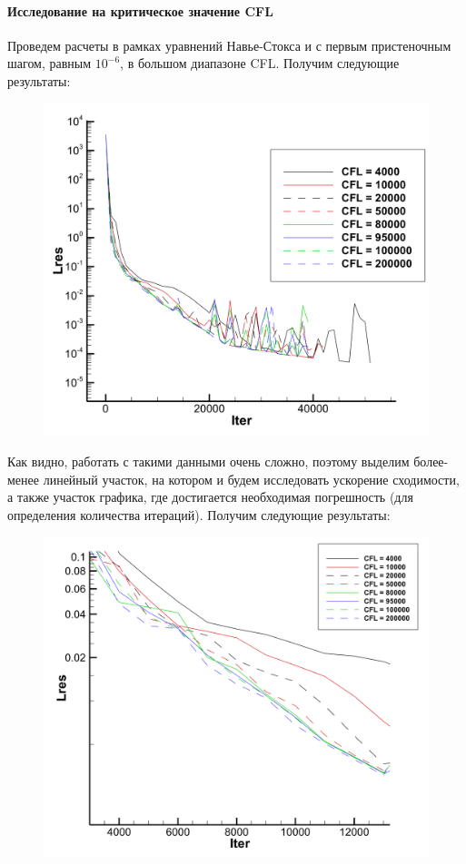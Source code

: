 \documentclass[12pt,a4paper, titlepage]{article}
\begin{document}
\paragraph{Исследование на критическое значение CFL}
Проведем расчеты в рамках уравнений Навье-Стокса и с первым пристеночным шагом, равным $10^{-6}$, в большом диапазоне CFL. Получим следующие результаты:
\begin{figure}[H]
	\centering
	\includegraphics[width = 1.0\textwidth]{ans_3_full.png}
\end{figure}
Как видно, работать с такими данными очень сложно, поэтому выделим более-менее линейный участок, на котором и будем исследовать ускорение сходимости, а также участок графика, где достигается необходимая погрешность (для определения количества итераций). Получим следующие результаты:
\begin{figure}[H]
	\centering
	\includegraphics[width = 1.0\textwidth]{ans_3_short.png}
\end{figure}
\end{document}
